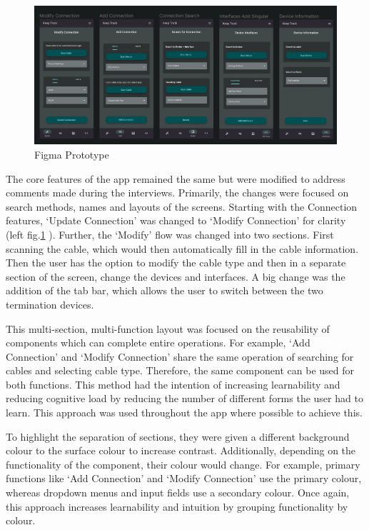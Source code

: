 \documentclass [11pt,a4paper]{article}
\begin{document}
\begin{figure}[H]
    \centering
    \includegraphics[width=1\textwidth]{images/figma_prototype.png}
    \caption{Figma Prototype}
    \label{fig:figma}
\end{figure}

The core features of the app remained the same but were modified to address comments made during the interviews. Primarily, the changes were focused on search methods, names and layouts of the screens. Starting with the Connection features, `Update Connection' was changed to `Modify Connection' for clarity (left fig.\ref{fig:figma} ). Further, the `Modify' flow was changed into two sections. First scanning the cable, which would then automatically fill in the cable information. Then the user has the option to modify the cable type and then in a separate section of the screen, change the devices and interfaces. A big change was the addition of the tab bar, which allows the user to switch between the two termination devices. 

This multi-section, multi-function layout was focused on the reusability of components which can complete entire operations. For example, `Add Connection' and `Modify Connection' share the same operation of searching for cables and selecting cable type. Therefore, the same component can be used for both functions. This method had the intention of increasing learnability and reducing cognitive load by reducing the number of different forms the user had to learn. This approach was used throughout the app where possible to achieve this.

To highlight the separation of sections, they were given a different background colour to the surface colour to increase contrast. Additionally, depending on the functionality of the component, their colour would change. For example, primary functions like `Add Connection' and `Modify Connection' use the primary colour, whereas dropdown menus and input fields use a secondary colour. Once again, this approach increases learnability and intuition by grouping functionality by colour.
\end{document}
